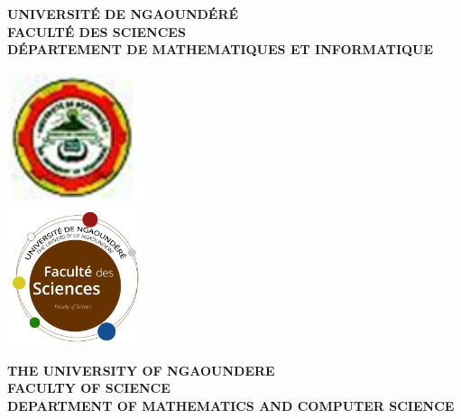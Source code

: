 \begin{titlepage}
\begin{center}
\begin{minipage}{0.38\textwidth}
\begin{centering} 
\bf{UNIVERSITÉ DE NGAOUNDÉRÉ}\\[0.2cm]
\bf{FACULTÉ DES SCIENCES}\\[0.2cm]
\bf{DÉPARTEMENT DE MATHEMATIQUES ET INFORMATIQUE}\\[0.2cm]
\end{centering}
\end{minipage}
\begin{minipage}{0.20\textwidth}
	\centering
	\includegraphics[width=0.30\textwidth]{./LogoUnivNg}\\
	\includegraphics[width=0.30\textwidth]{./LogoUnivNgFS}
	
\end{minipage}
\begin{minipage}{0.38\textwidth}
\begin{centering} 
\bf{THE UNIVERSITY OF NGAOUNDERE}\\[0.2cm]
\bf{FACULTY OF SCIENCE}\\[0.2cm]
\bf{DEPARTMENT OF MATHEMATICS AND COMPUTER SCIENCE}\\[0.2cm]
\end{centering}
\end{minipage}\\[1.5cm]


\end{center}
\end{titlepage}

